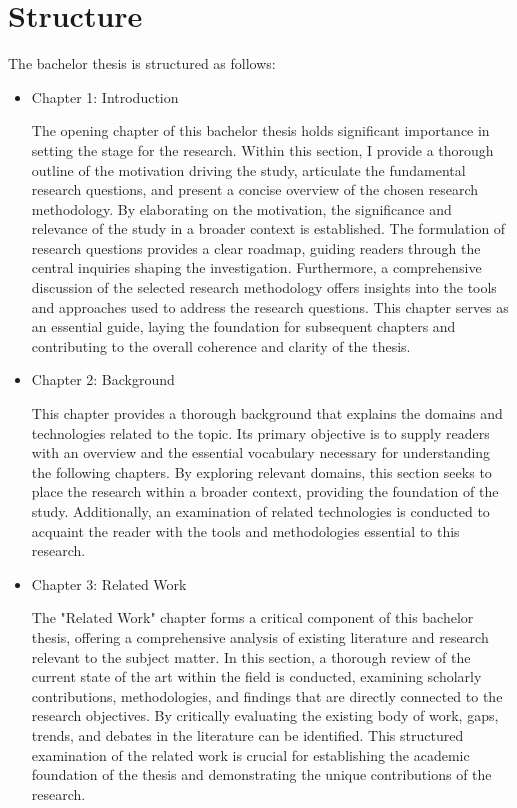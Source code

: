 \section{Structure}
The bachelor thesis is structured as follows:
\begin{itemize}
	\item Chapter 1: Introduction

 
    The opening chapter of this bachelor thesis holds significant importance in setting the stage for the research. Within this section, I provide a thorough outline of the motivation driving the study, articulate the fundamental research questions, and present a concise overview of the chosen research methodology. By elaborating on the motivation, the significance and relevance of the study in a broader context is established. The formulation of research questions provides a clear roadmap, guiding readers through the central inquiries shaping the investigation. Furthermore, a comprehensive discussion of the selected research methodology offers insights into the tools and approaches used to address the research questions. This chapter serves as an essential guide, laying the foundation for subsequent chapters and contributing to the overall coherence and clarity of the thesis.
	
	\item Chapter 2: Background
	
	This chapter provides a thorough background that explains the domains and technologies related to the topic. Its primary objective is to supply readers with an overview and the essential vocabulary necessary for understanding the following chapters. By exploring relevant domains, this section seeks to place the research within a broader context, providing the foundation of the study. Additionally, an examination of related technologies is conducted to acquaint the reader with the tools and methodologies essential to this research.
	
	\item Chapter 3: Related Work
	
	The "Related Work" chapter forms a critical component of this bachelor thesis, offering a comprehensive analysis of existing literature and research relevant to the subject matter. In this section, a thorough review of the current state of the art within the field is conducted, examining scholarly contributions, methodologies, and findings that are directly connected to the research objectives. By critically evaluating the existing body of work, gaps, trends, and debates in the literature can be identified. This structured examination of the related work is crucial for establishing the academic foundation of the thesis and demonstrating the unique contributions of the research.
	

\end{itemize}
